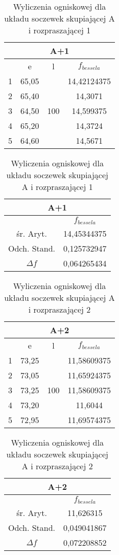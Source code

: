\documentclass{article}
\begin{document}
\begin{table}[!ht]
    \centering
    \begin{tabular}{|c|c|c|c|}
    \hline
        \multicolumn{4}{|c|}{A+1}\\\hline
        &e & l & $f_{bessela}$ \\ \hline
        1&65,05 & \multirow{5}{*}{100}& 14,42124375 \\ \cline{1-2} \cline{4-4}
        2&65,40 &  & 14,3071\\ \cline{1-2} \cline{4-4}
        3&64,50 &  & 14,599375 \\ \cline{1-2} \cline{4-4}
        4&65,20 &  & 14,3724 \\ \cline{1-2} \cline{4-4}
        5&64,60 & & 14,5671 \\ \hline
    \end{tabular}
    \begin{tabular}{|c|c|}
    \hline
            \multicolumn{2}{|c|}{A+1}\\\hline
        & $f_{bessela}$ \\ \hline
        śr. Aryt. & 14,45344375 \\ \hline
        Odch. Stand. & 0,125732947 \\ \hline
        $\Delta f$ & 0,064265434 \\ \hline
    \end{tabular}
        \caption{Wyliczenia ogniskowej dla układu soczewek skupiającej A i rozpraszającej 1}
    \label{tab:Wyl_4}
\end{table}

\begin{table}[!ht]
    \centering
    \begin{tabular}{|c|c|c|c|}
    \hline
            \multicolumn{4}{|c|}{A+2}\\\hline
        & e & l & $f_{bessela}$ \\ \hline
        1 & 73,25 & \multirow{5}{*}{100} & 11,58609375 \\ \cline{1-2} \cline{4-4}
        2 & 73,05 &  & 11,65924375 \\ \cline{1-2} \cline{4-4}
        3 & 73,25 &  & 11,58609375 \\ \cline{1-2} \cline{4-4}
        4 & 73,20 &  & 11,6044 \\ \cline{1-2} \cline{4-4}
        5 & 72,95 &  & 11,69574375 \\ \hline
    \end{tabular}
    \begin{tabular}{|c|c|}
    \hline
            \multicolumn{2}{|c|}{A+2}\\\hline
        & $f_{bessela}$ \\ \hline
        śr. Aryt. & 11,626315 \\ \hline
        Odch. Stand. & 0,049041867 \\ \hline
        $\Delta f$ & 0,072208852 \\ \hline
    \end{tabular}
            \caption{Wyliczenia ogniskowej dla układu soczewek skupiającej A i rozpraszającej 2}
    \label{tab:Wyl_5}
\end{table}
\end{document}
